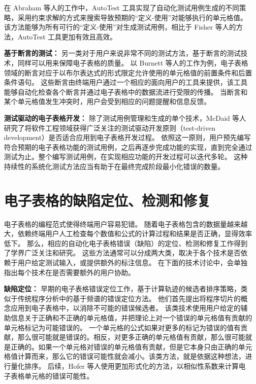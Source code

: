 在 Abraham 等人的工作\cite{abraham2006autotest}中，AutoTest 工具实现了自动化测试用例生成的不同策略，采用约束求解的方式来搜索导致预期的“定义-使用”对能够执行的单元格值。该方法能够为所有可行的“定义-使用”对生成测试用例，相比于 Fisher 等人的方法\cite{fisher2006integrating}，AutoTest 工具更加有效且高效。

\textbf{基于断言的测试：}
另一类对于用户来说非常不同的测试方法，基于断言的测试技术\cite{burnett2003end,wilson2003harnessing,beckwith2002reasoning}，同样可以用来保障电子表格的质量。
以 Burnett 等人的工作\cite{burnett2003end}为例，电子表格领域的断言对应于以布尔表达式的形式限定允许使用的单元格值的前置条件和后置条件语句。
这些断言由终端用户通过一个相应的面向用户的工具来提供，该工具能够自动化检查各个断言并通过电子表格中的数据流进行受限的传播。
当断言和某个单元格值发生冲突时，用户会受到相应的问题提醒和信息反馈。

\textbf{测试驱动的电子表格开发：}
除了测试用例管理和生成的单个技术，McDaid 等人\cite{mcdaid2008test}研究了将软件工程领域获得广泛关注的测试驱动开发原则（test-driven development）是否适合应用到电子表格开发过程。
依照这一原则，用户预先编写符合预期的电子表格功能的测试用例，之后再逐步完成功能的实现，直到完全通过测试为止。整个编写测试用例，在实现相应功能的开发过程可以迭代多轮。
这种持续性的系统化测试方法应当有助于在最终完成阶段最小化错误的数量。


\section{电子表格的缺陷定位、检测和修复}

电子表格的编程范式使得终端用户容易犯错。
随着电子表格包含的数据量越来越大，依赖终端用户人工检查每个数值和公式的计算过程和结果是否正确，显得效率低下。
那么，相应的自动化电子表格错误（缺陷）的定位、检测和修复工作得到了学界广泛关注和研究。
这些方法通常可以分成两大类，取决于各个技术是否依赖于用户给定测试输入，或提供额外的标注信息。
在下面的技术讨论中，会单独指出每个技术在是否需要额外的用户协助。

\textbf{缺陷定位：}
早期的电子表格错误定位工作\cite{reichwein1999slicing,ruthruff2005interactive}，基于计算轨迹的候选者排序策略，类似于传统程序分析中的基于频谱的错误定位方法。
他们首先提出将程序切片的概念应用到电子表格中，以消除不可能的错误候选者。
该类技术使用用户给定的辅助信息关于正确和不正确的单元格值，并把理论上对一个错误的单元格值有贡献的单元格标记为可能错误的。
一个单元格的公式如果对更多的标记为错误的值有贡献，那么很可能就是错误的。相反，对更多正确的单元格值有贡献，那么很可能就是正确的。如果一个单元格对错误的单元格值有贡献，但是它本身只由正确的单元格值计算而来，那么它的错误可能性就会减小。该类方法，就是依据这种想法，进行量化排序。
后续，Hofer 等人\cite{hofer2013empirical}使用更加形式化的方法，以相似性系数来计算电子表格单元格的错误可能性。

